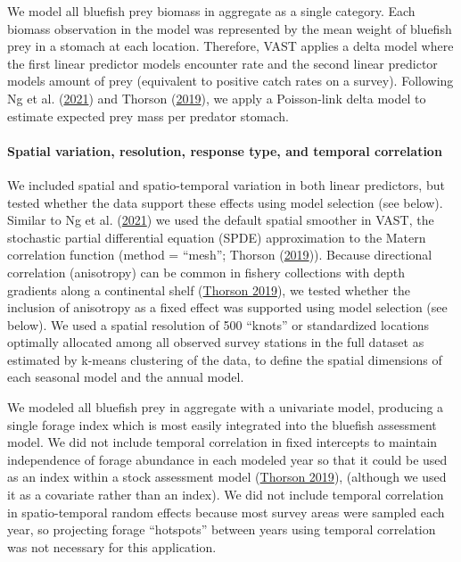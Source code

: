 \documentclass[
]{article}
\begin{document}
We model all bluefish prey biomass in aggregate as a single category. Each biomass observation in the model was represented by the mean weight of bluefish prey in a stomach at each location. Therefore, VAST applies a delta model where the first linear predictor models encounter rate and the second linear predictor models amount of prey (equivalent to positive catch rates on a survey). Following Ng et al. (\protect\hyperlink{ref-ng_predator_2021}{2021}) and Thorson (\protect\hyperlink{ref-thorson_guidance_2019}{2019}), we apply a Poisson-link delta model to estimate expected prey mass per predator stomach.

\hypertarget{spatial-variation-resolution-response-type-and-temporal-correlation}{%
\paragraph{Spatial variation, resolution, response type, and temporal correlation}\label{spatial-variation-resolution-response-type-and-temporal-correlation}}

We included spatial and spatio-temporal variation in both linear predictors, but tested whether the data support these effects using model selection (see below). Similar to Ng et al. (\protect\hyperlink{ref-ng_predator_2021}{2021}) we used the default spatial smoother in VAST, the stochastic partial differential equation (SPDE) approximation to the Mat\textquotesingle ern correlation function (method = ``mesh''; Thorson (\protect\hyperlink{ref-thorson_guidance_2019}{2019})). Because directional correlation (anisotropy) can be common in fishery collections with depth gradients along a continental shelf (\protect\hyperlink{ref-thorson_guidance_2019}{Thorson 2019}), we tested whether the inclusion of anisotropy as a fixed effect was supported using model selection (see below). We used a spatial resolution of 500 ``knots'' or standardized locations optimally allocated among all observed survey stations in the full dataset as estimated by k-means clustering of the data, to define the spatial dimensions of each seasonal model and the annual model.

We modeled all bluefish prey in aggregate with a univariate model, producing a single forage index which is most easily integrated into the bluefish assessment model. We did not include temporal correlation in fixed intercepts to maintain independence of forage abundance in each modeled year so that it could be used as an index within a stock assessment model (\protect\hyperlink{ref-thorson_guidance_2019}{Thorson 2019}), (although we used it as a covariate rather than an index). We did not include temporal correlation in spatio-temporal random effects because most survey areas were sampled each year, so projecting forage ``hotspots'' between years using temporal correlation was not necessary for this application.
\end{document}

